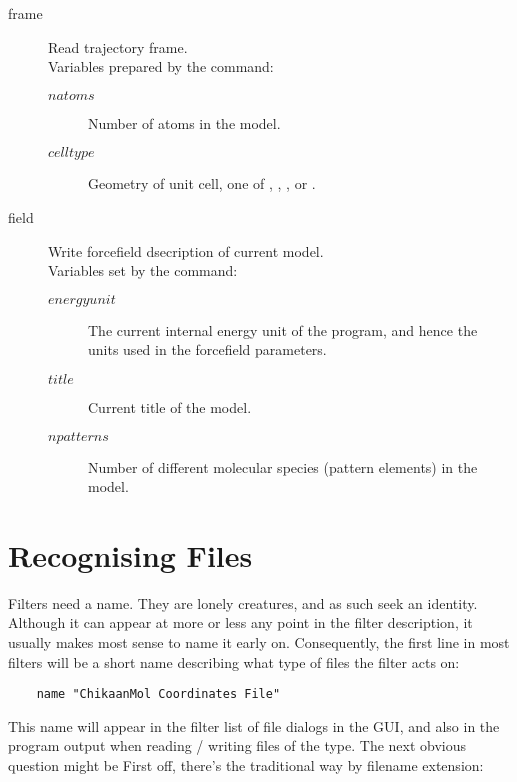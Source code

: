 \begin{description}
	\item[frame]
	Read trajectory frame.\\
	Variables prepared by the command:
	\begin{description}
		\item[$natoms$\its]
			Number of atoms in the model.
		\item[$celltype$\its]
			Geometry of unit cell, one of , , , or .
	\end{description}

	\item[field]
	Write forcefield dsecription of current model.\\
	Variables set by the command:
	\begin{description}
		\item[$energyunit$\its]
			The current internal energy unit of the program, and hence the units used in the forcefield parameters.
		\item[$title$\its]
			Current title of the model.
		\item[$npatterns$\its]
			Number of different molecular species (pattern elements) in the model.
	\end{description}

\end{description}

\section{Recognising Files}
\label{sec:filterrecog}

Filters need a name. They are lonely creatures, and as such seek an identity. Although it can appear at more or less any point in the filter description, it usually makes most sense to name it early on. Consequently, the first line in most filters will be a short name describing what type of files the filter acts on:

\begin{verbatim}
	name "ChikaanMol Coordinates File"
\end{verbatim}

This name will appear in the filter list of file dialogs in the GUI, and also in the program output when reading / writing files of the type. The next obvious question might be  First off, there's the traditional way by filename extension:

